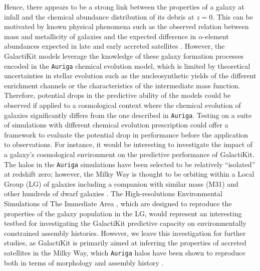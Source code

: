 Hence, there appears to be a strong link between the properties of a galaxy at infall and the chemical abundance distribution of its debris at $z=0$. This can be motivated by known physical phenomena such as the observed relation between mass and metallicity of galaxies \citep{Harmsen2017} and the expected difference in $\alpha$-element abundances expected in late and early accreted satellites \citep{Font2006a,Grimozzi2024}. However, the GalactiKit models leverage the knowledge of these galaxy formation processes encoded in the \texttt{Auriga} chemical evolution model, which is limited by theoretical uncertainties in stellar evolution such as the nucleosynthetic yields of the different enrichment channels or the characteristics of the intermediate mass function. Therefore, potential drops in the predictive ability of the models could be observed if applied to a cosmological context where the chemical evolution of galaxies significantly differs from the one described in \texttt{Auriga}. Testing on a suite of simulations with different chemical evolution prescription could offer a framework to evaluate the potential drop in performance before the application to observations. For instance, it would be interesting to investigate the impact of a galaxy's cosmological environment on the predictive performance of GalactiKit. The halos in the \texttt{Auriga} simulations have been selected to be relatively ``isolated'' at redshift zero; however, the Milky Way is thought to be orbiting within a Local Group (LG) of galaxies including a companion with similar mass (M31) and other hundreds of dwarf galaxies \citep{McConnachie2012}. The High-resolutions Environmental Simulations of The Immediate Area \citep[HESTIA,][]{Libeskind2020}, which are designed to reproduce the properties of the galaxy population in the LG,  would represent an interesting testbed for investigating the GalactiKit predictive capacity on environmentally constrained assembly histories. However, we leave this investigation for further studies, as GalactiKit is primarily aimed at inferring the properties of accreted satellites in the Milky Way, which \texttt{Auriga} halos have been shown to reproduce both in terms of morphology and assembly history \citep{Monachesi2019,Fattahi2019}. 

